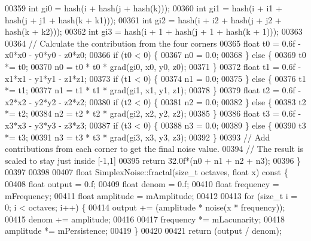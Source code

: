 \begin{DoxyCode}
00359     \textcolor{keywordtype}{int} gi0 = hash(i + hash(j + hash(k)));
00360     \textcolor{keywordtype}{int} gi1 = hash(i + i1 + hash(j + j1 + hash(k + k1)));
00361     \textcolor{keywordtype}{int} gi2 = hash(i + i2 + hash(j + j2 + hash(k + k2)));
00362     \textcolor{keywordtype}{int} gi3 = hash(i + 1 + hash(j + 1 + hash(k + 1)));
00363 
00364     \textcolor{comment}{// Calculate the contribution from the four corners}
00365     \textcolor{keywordtype}{float} t0 = 0.6f - x0*x0 - y0*y0 - z0*z0;
00366     \textcolor{keywordflow}{if} (t0 < 0) \{
00367         n0 = 0.0;
00368     \} \textcolor{keywordflow}{else} \{
00369         t0 *= t0;
00370         n0 = t0 * t0 * grad(gi0, x0, y0, z0);
00371     \}
00372     \textcolor{keywordtype}{float} t1 = 0.6f - x1*x1 - y1*y1 - z1*z1;
00373     \textcolor{keywordflow}{if} (t1 < 0) \{
00374         n1 = 0.0;
00375     \} \textcolor{keywordflow}{else} \{
00376         t1 *= t1;
00377         n1 = t1 * t1 * grad(gi1, x1, y1, z1);
00378     \}
00379     \textcolor{keywordtype}{float} t2 = 0.6f - x2*x2 - y2*y2 - z2*z2;
00380     \textcolor{keywordflow}{if} (t2 < 0) \{
00381         n2 = 0.0;
00382     \} \textcolor{keywordflow}{else} \{
00383         t2 *= t2;
00384         n2 = t2 * t2 * grad(gi2, x2, y2, z2);
00385     \}
00386     \textcolor{keywordtype}{float} t3 = 0.6f - x3*x3 - y3*y3 - z3*z3;
00387     \textcolor{keywordflow}{if} (t3 < 0) \{
00388         n3 = 0.0;
00389     \} \textcolor{keywordflow}{else} \{
00390         t3 *= t3;
00391         n3 = t3 * t3 * grad(gi3, x3, y3, z3);
00392     \}
00393     \textcolor{comment}{// Add contributions from each corner to get the final noise value.}
00394     \textcolor{comment}{// The result is scaled to stay just inside [-1,1]}
00395     \textcolor{keywordflow}{return} 32.0f*(n0 + n1 + n2 + n3);
00396 \}
00397 
00398 
00407 \textcolor{keywordtype}{float} SimplexNoise::fractal(\textcolor{keywordtype}{size\_t} octaves, \textcolor{keywordtype}{float} x)\textcolor{keyword}{ const }\{
00408     \textcolor{keywordtype}{float} output    = 0.f;
00409     \textcolor{keywordtype}{float} denom     = 0.f;
00410     \textcolor{keywordtype}{float} frequency = mFrequency;
00411     \textcolor{keywordtype}{float} amplitude = mAmplitude;
00412 
00413     \textcolor{keywordflow}{for} (\textcolor{keywordtype}{size\_t} i = 0; i < octaves; i++) \{
00414         output += (amplitude * noise(x * frequency));
00415         denom += amplitude;
00416 
00417         frequency *= mLacunarity;
00418         amplitude *= mPersistence;
00419     \}
00420 
00421     \textcolor{keywordflow}{return} (output / denom);

\end{DoxyCode}
